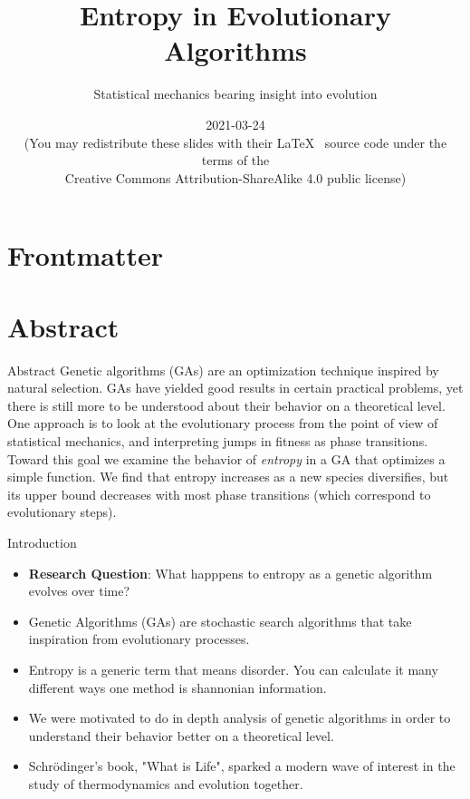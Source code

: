 \documentclass[handout,10pt,aspectratio=169]{beamer}
\title{Entropy in Evolutionary Algorithms}
\subtitle{Statistical mechanics bearing insight into evolution}
\date{2021-03-24 \\
  \smallskip
      {\smaller[4] (You may redistribute these slides with their \LaTeX\
        \vspace{-0.1cm}
        source code under the terms of the \\
        Creative Commons Attribution-ShareAlike 4.0 public license)}
}
\begin{document}
\section*{Frontmatter}

\begin{frame}
  \maketitle
\end{frame}

\section{Abstract}

\begin{frame}{Abstract}
	Genetic algorithms (GAs) are an optimization technique inspired by
	natural selection. GAs have yielded good results in certain practical
	problems, yet there is still more to be understood about their
	behavior on a theoretical level. One approach is to look at the
	evolutionary process from the point of view of statistical mechanics,
	and interpreting jumps in fitness as phase transitions. Toward this
	goal we examine the behavior of \emph{entropy} in a GA that optimizes
	a simple function.  We find that entropy increases as a new species
	diversifies, but its upper bound decreases with most phase
	transitions (which correspond to evolutionary steps).
\end{frame}

\begin{frame}{Introduction}
	\begin{itemize}
		\item \textbf{Research Question}: What happpens to entropy as a genetic algorithm evolves over time?
		\item Genetic Algorithms (GAs) are stochastic search algorithms that take inspiration from evolutionary processes. 
		\item Entropy is a generic term that means disorder. You can calculate it many different ways one method is shannonian information.
		\item We were motivated to do in depth analysis of genetic algorithms in order to understand their behavior better on a theoretical level.
		\item Schrödinger's book, "What is Life", sparked a modern wave of interest in the study of thermodynamics and evolution together.
	\end{itemize}
\end{frame}
\end{document}
